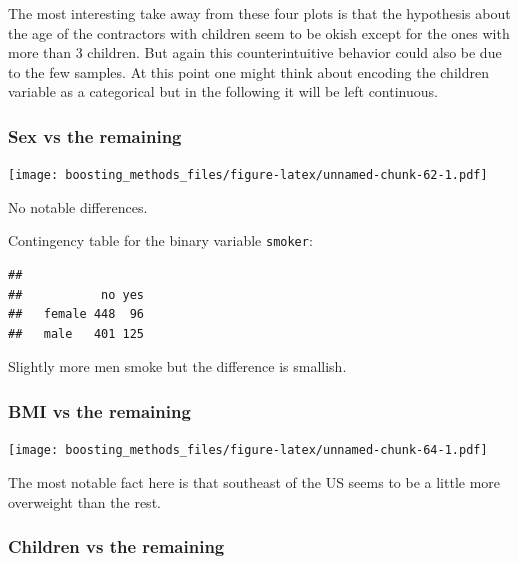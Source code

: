 \documentclass[
]{book}
\newenvironment{Shaded}{\begin{snugshade}}{\end{snugshade}}
\newcommand{\CommentTok}[1]{\textcolor[rgb]{0.56,0.35,0.01}{\textit{#1}}}
\newcommand{\FunctionTok}[1]{\textcolor[rgb]{0.00,0.00,0.00}{#1}}
\newcommand{\NormalTok}[1]{#1}
\newcommand{\SpecialCharTok}[1]{\textcolor[rgb]{0.00,0.00,0.00}{#1}}
\begin{document}
The most interesting take away from these four plots is that the hypothesis about the age of the contractors with children seem to be okish except for the ones with more than 3 children. But again this counterintuitive behavior could also be due to the few samples. At this point one might think about encoding the children variable as a categorical but in the following it will be left continuous.

\hypertarget{sex-vs-the-remaining}{%
\subsubsection{Sex vs the remaining}\label{sex-vs-the-remaining}}

\texttt{[image: boosting\_methods\_files/figure-latex/unnamed-chunk-62-1.pdf]}

No notable differences.

Contingency table for the binary variable \texttt{smoker}:

\begin{Shaded}
\end{Shaded}

\begin{verbatim}
##         
##           no yes
##   female 448  96
##   male   401 125
\end{verbatim}

Slightly more men smoke but the difference is smallish.

\hypertarget{bmi-vs-the-remaining}{%
\subsubsection{BMI vs the remaining}\label{bmi-vs-the-remaining}}

\texttt{[image: boosting\_methods\_files/figure-latex/unnamed-chunk-64-1.pdf]}

The most notable fact here is that southeast of the US seems to be a little more overweight than the rest.

\hypertarget{children-vs-the-remaining}{%
\subsubsection{Children vs the remaining}\label{children-vs-the-remaining}}
\end{document}
